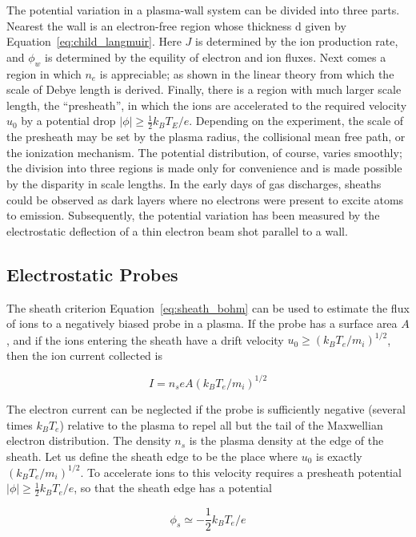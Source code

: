 \documentclass[
  notoc %
]{tufte-book}
\begin{document}
The potential variation in a plasma-wall system can be divided into
three parts. Nearest the wall is an electron-free region whose thickness
\(\mathrm{d}\) given by Equation~\ref{eq:child_langmuir}. Here \(J\) is
determined by the ion production rate, and \(\phi_w\) is determined by
the equility of electron and ion fluxes. Next comes a region in which
\(n_e\) is appreciable; as shown in the linear theory from which the
scale of Debye length is derived. Finally, there is a region with much
larger scale length, the ``presheath'', in which the ions are
accelerated to the required velocity \(u_0\) by a potential drop
\(|\phi|\ge \frac{1}{2}k_B T_E/e\). Depending on the experiment, the
scale of the presheath may be set by the plasma radius, the collisional
mean free path, or the ionization mechanism. The potential distribution,
of course, varies smoothly; the division into three regions is made only
for convenience and is made possible by the disparity in scale lengths.
In the early days of gas discharges, sheaths could be observed as dark
layers where no electrons were present to excite atoms to emission.
Subsequently, the potential variation has been measured by the
electrostatic deflection of a thin electron beam shot parallel to a
wall.

\hypertarget{electrostatic-probes}{%
\subsection{Electrostatic Probes}\label{electrostatic-probes}}

The sheath criterion Equation~\ref{eq:sheath_bohm} can be used to
estimate the flux of ions to a negatively biased probe in a plasma. If
the probe has a surface area \(A\), and if the ions entering the sheath
have a drift velocity \(u_0\ge (k_B T_e/m_i)^{1/2}\), then the ion
current collected is

\[
I = n_s e A(k_B T_e/m_i)^{1/2}
\]

The electron current can be neglected if the probe is sufficiently
negative (several times \(k_B T_e\)) relative to the plasma to repel all
but the tail of the Maxwellian electron distribution. The density
\(n_s\) is the plasma density at the edge of the sheath. Let us define
the sheath edge to be the place where \(u_0\) is exactly
\((k_B T_e/m_i)^{1/2}\). To accelerate ions to this velocity requires a
presheath potential \(|\phi|\ge\frac{1}{2}k_B T_e/e\), so that the
sheath edge has a potential

\[
\phi_s \simeq -\frac{1}{2}k_B T_e/e
\]
\end{document}
